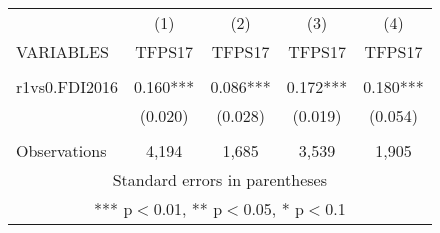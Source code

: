 \documentclass[]{article}
\begin{document}
\begin{tabular}{lcccc} \hline
 & (1) & (2) & (3) & (4) \\
VARIABLES & TFPS17 & TFPS17 & TFPS17 & TFPS17 \\ \hline
 &  &  &  &  \\
r1vs0.FDI2016 & 0.160*** & 0.086*** & 0.172*** & 0.180*** \\
 & (0.020) & (0.028) & (0.019) & (0.054) \\
 &  &  &  &  \\
 Observations & 4,194 & 1,685 & 3,539 & 1,905 \\ \hline
\multicolumn{5}{c}{ Standard errors in parentheses} \\
\multicolumn{5}{c}{ *** p$<$0.01, ** p$<$0.05, * p$<$0.1} \\
\end{tabular}
\end{document}
